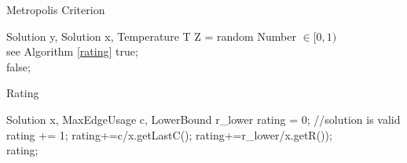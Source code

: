 \documentclass [12pt]{article}
\begin{document}
\begin {algorithm} [H]
\caption {Metropolis Criterion}
\label {metcrit}
\begin {algorithmic} [3]
\Require Solution y, Solution x, Temperature T
\State Z = random Number $\in [0,1)$
  \\ \Comment see Algorithm \ref{rating}
\Return true;
\EndIf\\
\Return false;
\end {algorithmic}
\end {algorithm}

\begin {algorithm} [H]
\caption {Rating}
\label {rating}
\begin {algorithmic} [3]
\Require Solution x, MaxEdgeUsage c, LowerBound r\_lower
\State rating = 0;
\State //solution is valid
    rating += 1;
\EndIf
\State rating+=c/x.getLastC();
\State rating+=r\_lower/x.getR());\\
\Return rating;

\end {algorithmic}
\end {algorithm}
\end{document}
